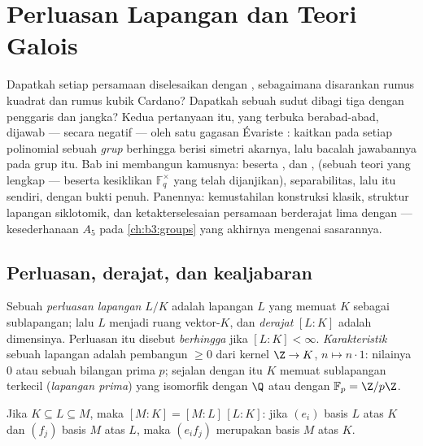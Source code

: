 \chapter{Perluasan Lapangan dan Teori Galois}\label{ch:b3:galois}

Dapatkah setiap persamaan diselesaikan dengan , sebagaimana disarankan rumus
kuadrat dan rumus kubik Cardano? Dapatkah sebuah sudut dibagi tiga
dengan penggaris dan jangka? Kedua pertanyaan itu, yang terbuka berabad-abad,
dijawab --- secara negatif --- oleh satu gagasan Évariste :
kaitkan pada setiap polinomial sebuah \emph{grup} berhingga berisi simetri
akarnya, lalu bacalah jawabannya pada grup itu. Bab ini membangun
kamusnya:  beserta ,  dan
,  (sebuah teori yang lengkap --- beserta
kesiklikan $\mathbb F_q^\times$ yang telah dijanjikan), separabilitas, lalu
 itu sendiri, dengan bukti penuh. Panennya:
kemustahilan konstruksi klasik, struktur
lapangan siklotomik, dan ketakterselesaian persamaan berderajat lima dengan
 --- kesederhanaan $A_5$ pada \cref{ch:b3:groups} yang akhirnya
mengenai sasarannya.

\section{Perluasan, derajat, dan kealjabaran}

\begin{definition}\label{def:b3:galois:extension}
Sebuah \emph{perluasan lapangan} $L/K$ adalah lapangan
$L$ yang memuat $K$ sebagai sublapangan; lalu $L$ menjadi ruang vektor-$K$,
dan \emph{derajat} $[L:K]$ adalah
dimensinya. Perluasan itu disebut \emph{berhingga} jika $[L:K] <
\infty$. \emph{Karakteristik} sebuah lapangan adalah pembangun
$\geq 0$ dari kernel $\Z \to K$, $n \mapsto n\cdot 1$: nilainya
$0$ atau sebuah bilangan prima $p$; sejalan dengan itu $K$ memuat sublapangan terkecil
(\emph{lapangan prima}) yang isomorfik dengan $\Q$ atau dengan $\mathbb
F_p = \Z/p\Z$.
\end{definition}

\begin{theorem}\label{thm:b3:galois:tower}
Jika $K \subseteq L \subseteq M$, maka $[M:K] = [M:L]\,[L:K]$: jika
$(e_i)$ basis $L$ atas $K$ dan $(f_j)$ basis $M$
atas $L$, maka $(e_if_j)$ merupakan basis $M$ atas
$K$.
\end{theorem}

